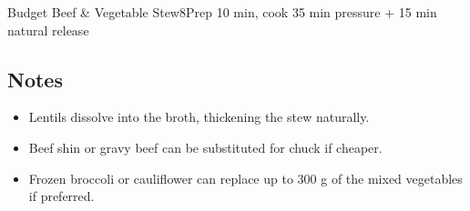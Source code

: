 \begin{recipebox}{Budget Beef \& Vegetable Stew}{8}{Prep 10 min, cook 35 min pressure + 15 min natural release}
\subsection*{Notes}
\begin{itemize}
    \item Lentils dissolve into the broth, thickening the stew naturally.
    \item Beef shin or gravy beef can be substituted for chuck if cheaper.
    \item Frozen broccoli or cauliflower can replace up to 300 g of the mixed vegetables if preferred.
\end{itemize}
\end{recipebox}
